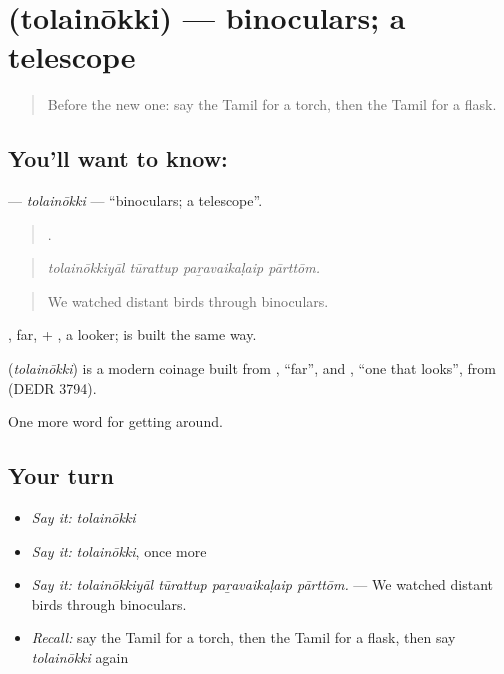 \section[\texorpdfstring{\ta{தொலைநோக்கி} (tolainōkki)}{தொலைநோக்கி (tolainōkki)}]{ (tolainōkki) — binoculars; a telescope}

\label{lesson:TA-C422-tolainokki}



\begin{quote}
Before the new one: say the Tamil for a torch, then the Tamil for a flask.
\end{quote}

\subsection*{You'll want to know: }
\textbf{} — \emph{tolainōkki} — \textquotedblleft{}binoculars; a telescope\textquotedblright{}.

\begin{quote}
   .
\end{quote}

\begin{quote}
\emph{tolainōkkiyāl tūrattup paṟavaikaḷaip pārttōm.}
\end{quote}

\begin{quote}
We watched distant birds through binoculars.
\end{quote}

, far, + , a looker;  is built the same way.

\begin{cousinweb}
\textbf{} (\emph{tolainōkki}) is a modern coinage built from , \textquotedblleft{}far\textquotedblright{}, and , \textquotedblleft{}one that looks\textquotedblright{}, from  (DEDR 3794).
\end{cousinweb}

\begin{grammarlens}[title={What you've built}]
One more word for getting around.
\end{grammarlens}

\subsection*{Your turn}
\begin{itemize}
\raggedright
  \item \emph{Say it:} \emph{tolainōkki}
  \item \emph{Say it:} \emph{tolainōkki}, once more
  \item \emph{Say it:} \emph{tolainōkkiyāl tūrattup paṟavaikaḷaip pārttōm.} — We watched distant birds through binoculars.
  \item \emph{Recall:} say the Tamil for a torch, then the Tamil for a flask, then say \emph{tolainōkki} again
\end{itemize}

